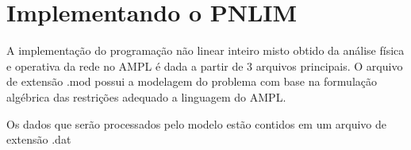 \section{Implementando o PNLIM}

A implementação do programação não linear inteiro misto obtido da análise física e operativa da rede no AMPL é dada a partir de 3 arquivos principais.
O arquivo de extensão .mod possui a modelagem do problema com base na formulação algébrica das restrições adequado a linguagem do AMPL. 



Os dados que serão processados pelo modelo estão contidos em um arquivo de extensão .dat


